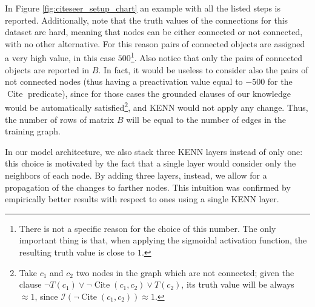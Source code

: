 In Figure \ref{fig:citeseer_setup_chart} an example with all the listed steps is reported.
Additionally, note that the truth values of the connections for this dataset are hard, meaning that nodes can be either connected or not connected, with no other alternative. For this reason pairs of connected objects are assigned a very high value, in this case $500$\footnote{There is not a specific reason for the choice of this number. The only important thing is that, when applying the sigmoidal activation function, the resulting truth value is close to $1$.}. Also notice that only the pairs of connected objects are reported in $B$. In fact, it would be useless to consider also the pairs of not connected nodes (thus having a preactivation value equal to $-500$ for the $\operatorname{Cite}$ predicate), since for those cases the grounded clauses of our knowledge would be automatically satisfied\footnote{Take $c_1$ and $c_2$ two nodes in the graph which are not connected; given the clause $\neg T(c_1) \vee \neg \operatorname{Cite}(c_1,c_2) \vee T(c_2)$, its truth value will be always $\approx 1$, since $\mathcal{I}(\neg \operatorname{Cite}(c_1,c_2)) \approx 1$. }, and KENN would not apply any change. Thus, the number of rows of matrix $B$ will be equal to the number of edges in the training graph.

In our model architecture, we also stack three KENN layers instead of only one: this choice is motivated by the fact that a single layer would consider only the neighbors of each node. By adding three layers, instead, we allow for a propagation of the changes to farther nodes. This intuition was confirmed by empirically better results with respect to ones using a single KENN layer.

